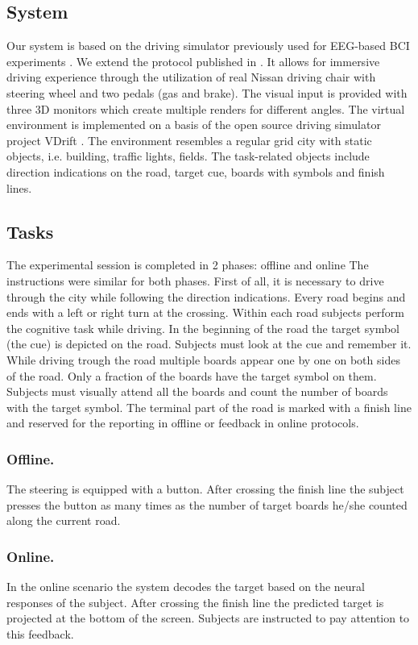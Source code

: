 \documentclass[12pt]{iopart}
\begin{document}
\subsection{System}
Our system is based on the driving simulator previously used for
EEG-based BCI experiments \cite{khaliliardali_action_2015,zhang_eeg-based_2015}.
We extend the protocol published in \cite{renold_eeg_2014}.
It allows for immersive driving experience through the utilization
of real Nissan driving chair with steering wheel and two pedals (gas and brake).
The visual input is provided with three 3D monitors which create multiple renders for
different angles. The virtual environment is implemented on a basis of
the open source driving simulator project VDrift \cite{noauthor_about_nodate}.
The environment resembles a regular grid city with static objects, i.e.
building, traffic lights, fields. The task-related objects include
direction indications on the road, target cue, boards with symbols
and finish lines. 

\subsection{Tasks}
The experimental session is completed in 2 phases: offline and online
The instructions were similar for both phases.
First of all, it is necessary to drive through the city while
following the direction indications.
Every road begins and ends with a left or right turn at the crossing.
Within each road subjects perform the cognitive task while driving.
In the beginning of the road the target symbol (the cue) is depicted
on the road. Subjects must look at the cue and remember it.
While driving trough the road multiple boards appear one by one
on both sides of the road. Only a fraction of the boards have
the target symbol on them. Subjects must visually attend all the boards
and count the number of boards with the target symbol. 
The terminal part of the road is marked with a finish line and 
reserved for the reporting in offline or feedback in online protocols.

\subsubsection*{Offline.}
The steering is equipped with a button.
After crossing the finish line the subject presses the button as many times
as the number of target boards he/she counted along the current road.
\subsubsection*{Online.}
In the online scenario the system decodes the target based
on the neural responses of the subject. 
After crossing the finish line the predicted target is projected
at the bottom of the screen. Subjects are instructed to pay
attention to this feedback.
\end{document}
